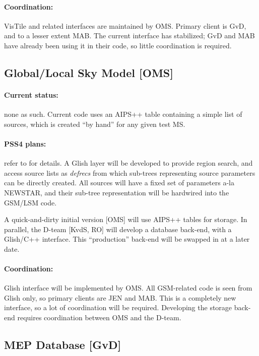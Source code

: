\documentclass[12pt]{article}
\begin{document}
  \paragraph{Coordination:} VisTile and related interfaces are maintained by
  OMS. Primary client is GvD, and to a lesser extent MAB. The current
  interface has stabilized; GvD and MAB have already been using it in their
  code, so little coordination is required.

\subsection{Global/Local Sky Model [OMS]}

  \paragraph{Current status:} none as such. Current code uses an AIPS++
  table containing a simple list of sources, which is created ``by hand'' for
  any given test MS. 

  \paragraph{PSS4 plans:} refer to \cite{GSM} for details. A Glish layer
  will be developed to provide region search, and access source lists as {\em
  defrecs} from which sub-trees representing source parameters can be directly
  created. All sources will have a fixed set of parameters a-la NEWSTAR, and
  their sub-tree representation will be hardwired into the GSM/LSM code.
  
  A quick-and-dirty initial version [OMS] will use AIPS++ tables for storage.
  In parallel, the D-team [KvdS, RO] will develop a database back-end, with a
  Glish/C++ interface. This ``production'' back-end will be swapped in at a
  later date. 
  
  \paragraph{Coordination:} Glish interface will be implemented by OMS.  All
  GSM-related code is seen from Glish only, so primary clients are JEN and MAB.
  This is a completely new interface, so a lot of coordination will be
  required. Developing the storage back-end requires coordination between OMS
  and the D-team.

\subsection{MEP Database [GvD]}
\end{document}
